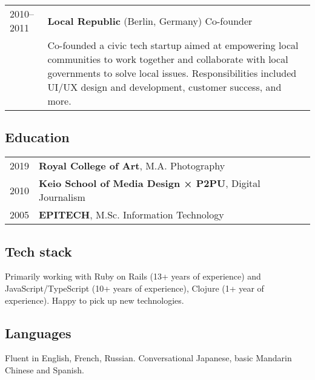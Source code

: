 \documentclass[a4paper,11pt]{article}
\def\companystrut{\rule{0pt}{1.2\normalbaselineskip}}
\def\descriptionstrut{\rule{0pt}{0.9\normalbaselineskip}}
\begin{document}
\begin{tabular}{ p{4.5em} p{41.5em} }
  2010–2011\companystrut & \textbf{Local Republic} (Berlin, Germany) Co-founder\\
           & \descriptionstrut Co-founded a civic tech startup aimed at empowering local
             communities to work together and collaborate with local governments to solve
             local issues. Responsibilities included UI/UX design and development, customer
             success, and more.\\
\end{tabular}

\subsection*{Education}

\begin{tabular}{ p{4.5em} p{30em} }
  2019 & \textbf{Royal College of Art}, M.A. Photography\\
  2010\descriptionstrut & \textbf{Keio School of Media Design × P2PU}, Digital Journalism\\
  2005\descriptionstrut & \textbf{EPITECH}, M.Sc. Information Technology\\
\end{tabular}

\subsection*{Tech stack}

Primarily working with Ruby on Rails (13+ years of experience) and
JavaScript/TypeScript (10+ years of experience), Clojure (1+ year of
experience). Happy to pick up new technologies.

\subsection*{Languages}

Fluent in English, French, Russian. Conversational Japanese, basic Mandarin
Chinese and Spanish.
\end{document}
